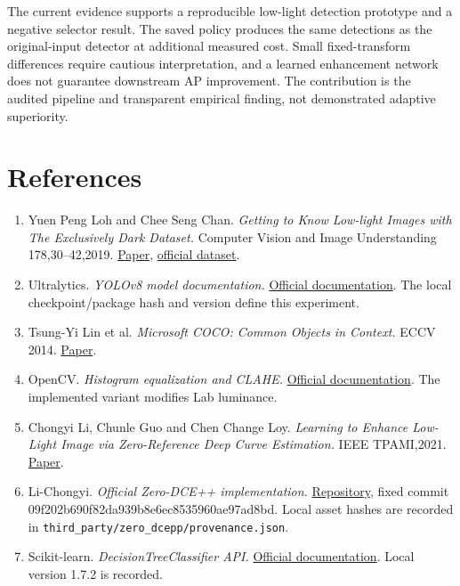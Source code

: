 \documentclass[11pt,a4paper]{article}
\begin{document}
The current evidence supports a reproducible low-light detection prototype and a negative selector result. The saved policy produces the same detections as the original-input detector at additional measured cost. Small fixed-transform differences require cautious interpretation, and a learned enhancement network does not guarantee downstream AP improvement. The contribution is the audited pipeline and transparent empirical finding, not demonstrated adaptive superiority.


\section{References}
\begin{enumerate}

\item Yuen Peng Loh and Chee Seng Chan. \emph{Getting to Know Low-light Images with The Exclusively Dark Dataset.} Computer Vision and Image Understanding 178,30--42,2019. \href{https://arxiv.org/abs/1805.11227}{Paper}, \href{https://github.com/cs-chan/Exclusively-Dark-Image-Dataset}{official dataset}.
\item Ultralytics. \emph{YOLOv8 model documentation.} \href{https://docs.ultralytics.com/models/yolov8/}{Official documentation}. The local checkpoint/package hash and version define this experiment.
\item Tsung-Yi Lin et al. \emph{Microsoft COCO: Common Objects in Context.} ECCV 2014. \href{https://arxiv.org/abs/1405.0312}{Paper}.
\item OpenCV. \emph{Histogram equalization and CLAHE.} \href{https://docs.opencv.org/4.x/d5/daf/tutorial\_py\_histogram\_equalization.html}{Official documentation}. The implemented variant modifies Lab luminance.
\item Chongyi Li, Chunle Guo and Chen Change Loy. \emph{Learning to Enhance Low-Light Image via Zero-Reference Deep Curve Estimation.} IEEE TPAMI,2021. \href{https://arxiv.org/abs/2103.00860}{Paper}.
\item Li-Chongyi. \emph{Official Zero-DCE++ implementation.} \href{https://github.com/Li-Chongyi/Zero-DCE\_extension}{Repository}, fixed commit 09f202b690f82da939b8e6ec8535960ae97ad8bd. Local asset hashes are recorded in \texttt{third\_party/zero\_dcepp/provenance.json}.
\item Scikit-learn. \emph{DecisionTreeClassifier API.} \href{https://scikit-learn.org/stable/modules/generated/sklearn.tree.DecisionTreeClassifier.html}{Official documentation}. Local version 1.7.2 is recorded.

\end{enumerate}
\end{document}
